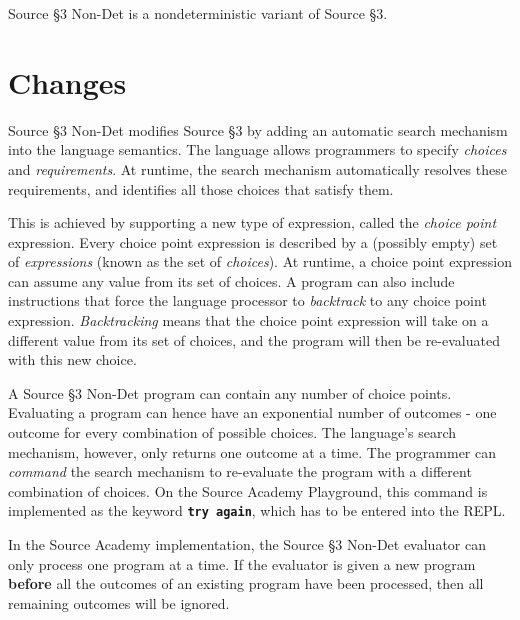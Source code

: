 





Source \S 3 Non-Det is a nondeterministic variant of Source \S 3.

\section*{Changes}

Source \S 3 Non-Det modifies Source \S 3 by adding an automatic search mechanism into the language semantics. The language allows programmers to specify \emph{choices} and \emph{requirements}. At runtime, the search mechanism automatically resolves these requirements, and identifies all those choices that satisfy them. \newline

This is achieved by supporting a new type of expression, called the \emph{choice point} expression. Every choice point expression is described by a (possibly empty) set of \emph{expressions} (known as the set of \emph{choices}). At runtime, a choice point expression can assume any value from its set of choices. A program can also include instructions that force the language processor to \emph{backtrack} to any choice point expression. \emph{Backtracking} means that the choice point expression will take on a different value from its set of choices, and the program will then be re-evaluated with this new choice. \newline

A Source \S 3 Non-Det program can contain any number of choice points. Evaluating a program can hence have an exponential number of outcomes - one outcome for every combination of possible choices. The language's search mechanism, however, only returns one outcome at a time. The programmer can \emph{command} the search mechanism to re-evaluate the program with a different combination of choices. On the Source Academy Playground, this command is implemented as the keyword
\textbf{\texttt{try again}}, which has to be entered into the REPL. \newline

In the Source Academy implementation, the Source \S 3 Non-Det evaluator can only process one program at a time. If the evaluator is given a new program \textbf{before} all the outcomes of an existing program have been processed, then all remaining outcomes will be ignored. \newline

